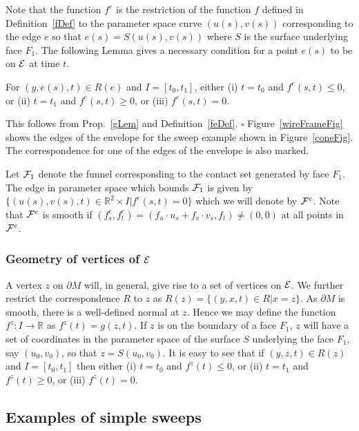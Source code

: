 \documentclass{elsart5p}
\begin{document}
Note that the function $f^e$ is the restriction of the function $f$ defined in Definition~\ref{fDef} to 
the parameter space curve $(u(s), v(s))$ corresponding to the edge $e$ so that $e(s) = S(u(s), v(s))$ 
where $S$ is the surface underlying face $F_1$.  The following Lemma gives a necessary condition for 
a point $e(s)$ to be on ${\cal E}$ at time $t$.
\begin{lem} \label{feLem}
For $(y, e(s), t) \in R(e)$ and $I = [t_0, t_1]$, either (i) $t = t_0$ and $f^e(s,t) \leq 0$, or 
(ii) $t = t_1$ and $f^e(s,t) \geq 0$, or (iii) $f^e(s,t) = 0$.
\end{lem}
  This follows from Prop.~\ref{gLem} and Definition~\ref{feDef}. 
\hfill $\square$
Figure~\ref{wireFrameFig} shows the edges of the envelope for 
the sweep example shown in Figure~\ref{coneFig}.  The correspondence for one of the edges of the envelope is also marked.


Let ${\cal F}_1$ denote the funnel corresponding to the contact set generated by face $F_1$.
The edge in parameter space which bounds ${\cal F}_1$ is given by 
$\{ (u(s), v(s), t) \in \mathbb{R}^2 \times I | f^e(s,t) = 0 \}$ which we will denote by 
${\cal F}^e$.  Note that ${\cal F}^e$ is smooth if 
$(f^e_s, f^e_t) = (f_u \cdot u_s + f_v \cdot v_s, f_t) \neq (0,0)$ at all points
in ${\cal F}^e$.


\subsubsection{Geometry of vertices of ${\cal E}$}

A vertex $z$ on ${\partial M}$ will, in general, give rise to a set of vertices on ${\cal E}$.  We further 
restrict the correspondence $R$ to $z$ as $R(z) = \{(y, x, t) \in R | x = z \}$.  As $\partial M$ is smooth, there is a well-defined normal at $z$.  Hence we may define the function 
$f^z: I \to \mathbb{R}$ as $f^z(t) = g(z,t)$.  If $z$ is on the boundary of a face $F_1$, $z$ will 
have a set of coordinates in the parameter space of the surface $S$ underlying the face $F_1$, say $(u_0, v_0)$, 
so that $z = S(u_0, v_0)$.  It is easy to see that if $(y,z,t) \in R(z)$ and $I = [t_0, t_1]$ then 
either (i) $t = t_0$ and $f^z(t) \leq 0$, or (ii) $t = t_1$ and $f^z(t) \geq 0$, or (iii) $f^z(t) = 0$.

\subsection{Examples of simple sweeps}
\end{document}
